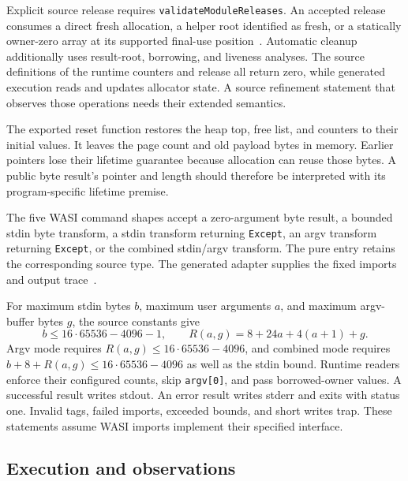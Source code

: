 \documentclass[11pt]{article}
\newcommand{\code}[1]{\texttt{#1}}
\begin{document}
Explicit source release requires \code{validateModuleReleases}.  An accepted release consumes a direct fresh allocation, a helper root identified as fresh, or a statically owner-zero array at its supported final-use position~\cite{release}.  Automatic cleanup additionally uses result-root, borrowing, and liveness analyses.  The source definitions of the runtime counters and release all return zero, while generated execution reads and updates allocator state.  A source refinement statement that observes those operations needs their extended semantics.

The exported reset function restores the heap top, free list, and counters to their initial values.  It leaves the page count and old payload bytes in memory.  Earlier pointers lose their lifetime guarantee because allocation can reuse those bytes.  A public byte result's pointer and length should therefore be interpreted with its program-specific lifetime premise.

The five WASI command shapes accept a zero-argument byte result, a bounded stdin byte transform, a stdin transform returning \code{Except}, an argv transform returning \code{Except}, or the combined stdin/argv transform.  The pure entry retains the corresponding source type.  The generated adapter supplies the fixed imports and output trace~\cite{binary,specification}.

For maximum stdin bytes $b$, maximum user arguments $a$, and maximum argv-buffer bytes $g$, the source constants give
\[
b\le16\cdot65536-4096-1,
\qquad R(a,g)=8+24a+4(a+1)+g.
\]
Argv mode requires $R(a,g)\le16\cdot65536-4096$, and combined mode requires $b+8+R(a,g)\le16\cdot65536-4096$ as well as the stdin bound.  Runtime readers enforce their configured counts, skip \code{argv[0]}, and pass borrowed-owner values.  A successful result writes stdout.  An error result writes stderr and exits with status one.  Invalid tags, failed imports, exceeded bounds, and short writes trap.  These statements assume WASI imports implement their specified interface.

\subsection{Execution and observations}
\end{document}
